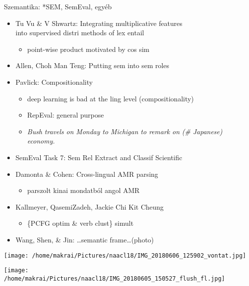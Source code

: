 \documentclass{beamer}
\newcommand{\bull}[1]{\begin{itemize}\item #1 \end{itemize}}
\begin{document}
   \begin{frame}{Szemantika: *SEM, SemEval, egyéb}
     \begin{itemize}
       \item Tu Vu \& V Shwartz:  
         Integrating multiplicative features \\ into supervised distri methods of lex entail 
             \bull{ point-wise product motivated by cos sim}
           \item Allen, Choh Man Teng:  Putting sem into sem roles 
           \item Pavlick:  Compositionality
             \begin{itemize}
               \item deep learning is bad at the ling level (compositionality)
               \item RepEval:  general purpose
               \item \emph{Bush travels on Monday to Michigan to remark on (\# Japanese)
                 economy.}
             \end{itemize}
           \item {SemEval Task 7: Sem Rel Extract and Classif Scientific}
           \item Damonta \& Cohen:  Cross-lingual AMR parsing
             \bull{ parszolt kinai mondatból angol AMR}
           \item Kallmeyer, QasemiZadeh, Jackie Chi Kit Cheung
             \bull {\{PCFG optim \& verb clust\} simult}
           \item Wang, Shen, \& Jin:  \dots semantic frame\dots  (photo) 
     \end{itemize} 
   \end{frame}

   \begin{frame}[allowframebreaks]
     \texttt{[image: /home/makrai/Pictures/naacl18/IMG\_20180606\_125902\_vontat.jpg]} 

     \texttt{[image: /home/makrai/Pictures/naacl18/IMG\_20180605\_150527\_flush\_fl.jpg]}
   \end{frame}
\end{document}
